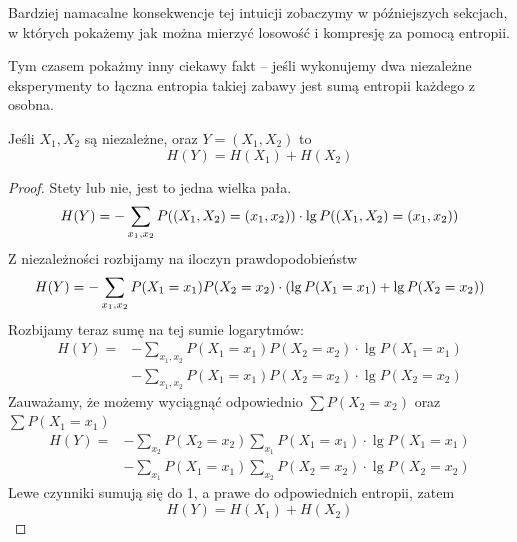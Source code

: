Bardziej namacalne konsekwencje tej intuicji zobaczymy w późniejszych sekcjach, w których pokażemy jak można mierzyć losowość i kompresję za pomocą entropii.

Tym czasem pokażmy inny ciekawy fakt -- jeśli wykonujemy dwa niezależne eksperymenty to łączna entropia takiej zabawy jest sumą entropii każdego z osobna.

\begin{theorem}[Lemat 10.1 P\&C]
	Jeśli \( X_1, X_2 \) są niezależne, oraz \( Y = (X_1, X_2) \) to
	\[
		H(Y) = H(X_1) + H(X_2)
	\]
\end{theorem}
\begin{proof}
	Stety lub nie, jest to jedna wielka pała.
	\[
		H(Y) = -\sum_{x_1, x_2} P\pars{(X_1, X_2) = (x_1, x_2)} \cdot \lg P\pars{(X_1, X_2) = (x_1, x_2)}
	\]
	Z niezależności rozbijamy na iloczyn prawdopodobieństw
	\[
		H(Y) = -\sum_{x_1, x_2} P(X_1=x_1)P(X_2=x_2) \cdot \left(\lg P(X_1=x_1) + \lg P(X_2=x_2)\right)
	\]
	Rozbijamy teraz sumę na tej sumie logarytmów:
	\begin{align*}
		H(Y) = & -\sum_{x_1, x_2} P(X_1=x_1)P(X_2=x_2) \cdot \lg P(X_1=x_1) \\
		       & -\sum_{x_1, x_2} P(X_1=x_1)P(X_2=x_2) \cdot \lg P(X_2=x_2)
	\end{align*}
	Zauważamy, że możemy wyciągnąć odpowiednio \( \sum P(X_2 = x_2) \) oraz \( \sum P(X_1 = x_1) \)
	\begin{align*}
		H(Y) = & -\sum_{x_2} P(X_2 = x_2) \sum_{x_1} P(X_1=x_1) \cdot \lg P(X_1=x_1) \\
		       & -\sum_{x_1} P(X_1 = x_1) \sum_{x_2} P(X_2=x_2) \cdot \lg P(X_2=x_2)
	\end{align*}
	Lewe czynniki sumują się do 1, a prawe do odpowiednich entropii, zatem
	\[
		H(Y) = H(X_1) + H(X_2)
	\]
\end{proof}